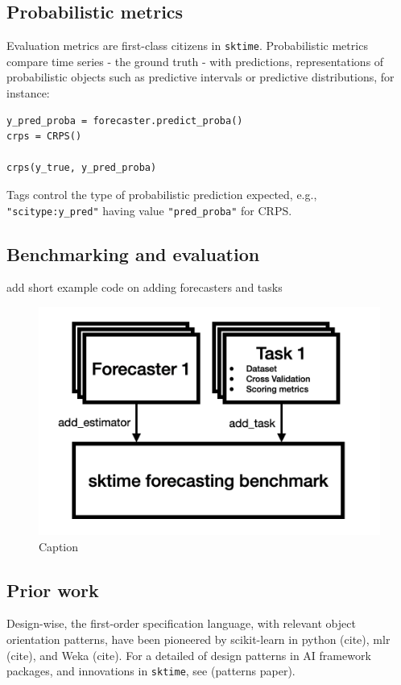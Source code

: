 \subsection{Probabilistic metrics}

Evaluation metrics are first-class citizens in \texttt{sktime}. Probabilistic metrics compare time series - the ground truth - with predictions, representations of probabilistic objects such as predictive intervals or predictive distributions, for instance:

\begin{verbatim}
y_pred_proba = forecaster.predict_proba()
crps = CRPS()

crps(y_true, y_pred_proba)
\end{verbatim}

Tags control the type of probabilistic prediction expected, e.g., \texttt{"scitype:y\_pred"} having value \texttt{"pred\_proba"} for CRPS.

\subsection{Benchmarking and evaluation}

add short example code on adding forecasters and tasks
\begin{figure}
    \centering
    \includegraphics[width=.5\textwidth]{Figures/evaluationFramework.png}
    \caption{Caption}
    \label{fig:enter-label}
\end{figure}

\subsection{Prior work}

Design-wise, the first-order specification language, with relevant object orientation patterns, have been pioneered by scikit-learn in python (cite), mlr (cite), and Weka (cite). For a detailed of design patterns in AI framework packages, and innovations in \texttt{sktime}, see (patterns paper).

